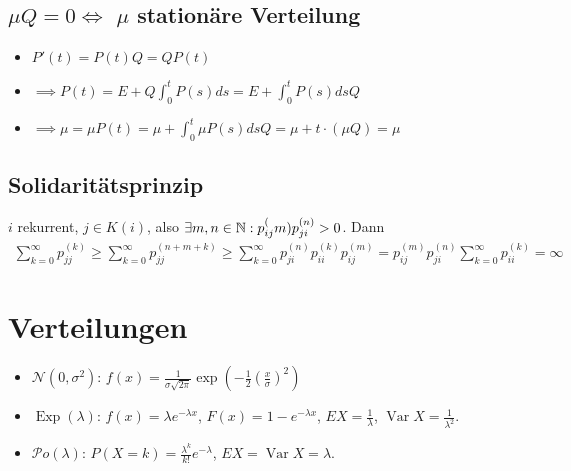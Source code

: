 \documentclass[a4paper,DIV15]{scrartcl}
\begin{document}
\subsection{$\mu Q = 0 \iff$ $\mu$ stationäre Verteilung}
\begin{itemize}
\item $P'(t) = P(t)Q = QP(t)$
\item $\implies P(t) = E + Q\int_0^t P(s)ds = E+\int_0^t P(s)ds Q$
\item $\implies \mu = \mu P(t) = \mu  + \int_0^t \mu P(s) ds Q = \mu  + t \cdot (\mu Q) = \mu$
\end{itemize}

\subsection{Solidaritätsprinzip}
$i$ rekurrent, $j\in K(i)$, also $\exists m,n\in\mathbb{N}: p_{ij}^(m)p_{ji}^{(n)} > 0$. Dann
\begin{align*}
\sum_{k=0}^\infty p_{jj}^{(k)} \ge \sum_{k=0}^\infty p_{jj}^{(n+m+k)}
\ge \sum_{k=0}^\infty p_{ji}^{(n)} p_{ii}^{(k)} p_{ij}^{(m)}
= p_{ij}^{(m)}p_{ji}^{(n)} \sum_{k=0}^\infty p_{ii}^{(k)} = \infty
\end{align*}

\section{Verteilungen}

\begin{itemize}
\item $\mathcal N(0,\sigma^2)$: $f(x) = \frac1{\sigma \sqrt{2\pi}} \exp(-\frac 12 (\frac x \sigma)^2)$
\item $\operatorname{Exp}(\lambda)$: $f(x) =\lambda e^{-\lambda x}$, $F(x)=1-e^{-\lambda x}$, $EX=\frac 1 \lambda$, $\operatorname{Var}X=\frac1{\lambda^2}$.
\item $\mathcal Po(\lambda)$: $P(X=k)=\frac{\lambda^k}{k!} e^{-\lambda}$, $EX=\operatorname{Var}X=\lambda$.
\end{itemize}
\end{document}
